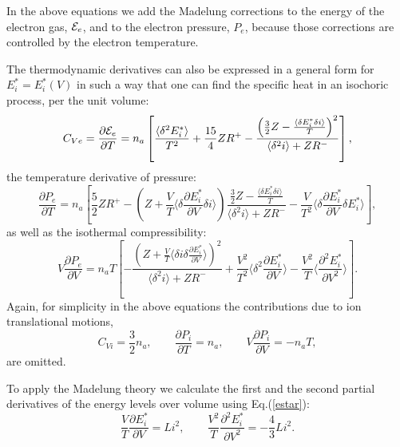In the above equations we add the Madelung corrections to the energy of the electron gas, ${\cal E}_e$, and
to the electron pressure, $P_e$, because those corrections are controlled by the electron temperature.

The thermodynamic derivatives can also be expressed in a general form for $E^*_i=E^*_i(V)$
in such a way that one can find the specific heat in an isochoric process, per the unit volume:
\begin{equation}\label{generalCv}
C_{Ve}=\frac{\partial {\cal E}_e}{\partial T}=n_a\left[\frac{\langle\delta^2 E^*_i \rangle}{T^2}+\frac{15}4ZR^+
-\frac{\left(\frac32Z-\frac{\langle\delta E^*_i \delta i\rangle}T\right)^2}{\langle\delta^2i\rangle+ZR^-}\right],
\end{equation}
the temperature derivative of pressure:
\begin{equation}\label{generalPT}
\frac {\partial P_e}{\partial T}=
n_a\left[
	\frac52 Z R^+ -
	\left( Z+\frac{V}{T} \langle \delta \frac{\partial E^*_i}{\partial V} \delta i \rangle \right)
		\frac{\frac32Z-\frac{\langle\delta E^*_i \delta i\rangle}T}{\langle\delta^2i\rangle+ZR^-} -
	\frac{V}{T^2} \langle \delta \frac{\partial E^*_i}{\partial V} \delta E^*_i \rangle
\right],
\end{equation}
as well as the isothermal compressibility:
\begin{equation}\label{generalCompr}
V\frac{\partial P_e}{\partial V}=
n_a T \left[ -\frac{\left(Z + \frac{V}{T} \langle \delta i \delta \frac{\partial E^*_i}{\partial V} \rangle \right)^2}
{\langle \delta^2 i \rangle + ZR^-} +
\frac{V^2}{T^2} \langle \delta^2 \frac{\partial E^*_i}{\partial V} \rangle -
\frac{V^2}{T} \langle \frac{\partial^2 E^*_i}{\partial V^2} \rangle
\right].
\end{equation}
Again, for simplicity in the above equations the contributions due to ion translational motions,
\begin{equation}
C_{Vi}=\frac32n_a, \qquad
\frac{\partial P_i}{\partial T}=n_a, \qquad
V\frac{\partial P_i}{\partial V}=-n_aT,
\end{equation}
are omitted.

To apply the Madelung theory we calculate the first and the second partial derivatives
of the energy levels over volume using Eq.(\ref{estar}):
\begin{equation}\label{estarprime}
\frac{V}{T} \frac{\partial E^*_i}{\partial V} = L i^2, \qquad
\frac{V^2}{T} \frac{\partial^2 E^*_i}{\partial V^2} = -\frac43 L i^2.
\end{equation}


